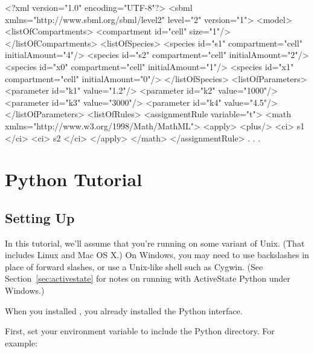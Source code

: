 \documentclass{sbmlmanual}
\begin{document}
\begin{boxedCodeVerbatim}
<?xml version="1.0" encoding="UTF-8"?>
<sbml xmlns="http://www.sbml.org/sbml/level2" level="2" version="1">
  <model>
    <listOfCompartments>
      <compartment id="cell" size="1"/>
    </listOfCompartments>
    <listOfSpecies>
      <species id="s1" compartment="cell" initialAmount="4"/>
      <species id="s2" compartment="cell" initialAmount="2"/>
      <species id="x0" compartment="cell" initialAmount="1"/>
      <species id="x1" compartment="cell" initialAmount="0"/>
    </listOfSpecies>
    <listOfParameters>
      <parameter id="k1" value="1.2"/>
      <parameter id="k2" value="1000"/>
      <parameter id="k3" value="3000"/>
      <parameter id="k4" value="4.5"/>
    </listOfParameters>
    <listOfRules>
      <assignmentRule variable="t">
        <math xmlns="http://www.w3.org/1998/Math/MathML">
          <apply>
            <plus/>
            <ci> s1 </ci>
            <ci> s2 </ci>
          </apply>
        </math>
      </assignmentRule>
      . . .
\end{boxedCodeVerbatim}


\section{Python Tutorial}
\label{sec:python}

\subsection{Setting Up}
\label{sec:python-setting-up}

In this tutorial, we'll assume that you're running on some
variant of Unix.  (That includes Linux and Mac OS X.) On
Windows, you may need to use backslashes in place of forward slashes, or use a
Unix-like shell such as Cygwin. (See Section~\ref{sec:activestate} for notes
on running with ActiveState Python under Windows.)

When you installed \libsbml{}, you already installed the Python
interface.

First, set your  environment variable to include
the \libsbml{} Python directory.  For example:

\end{document}
